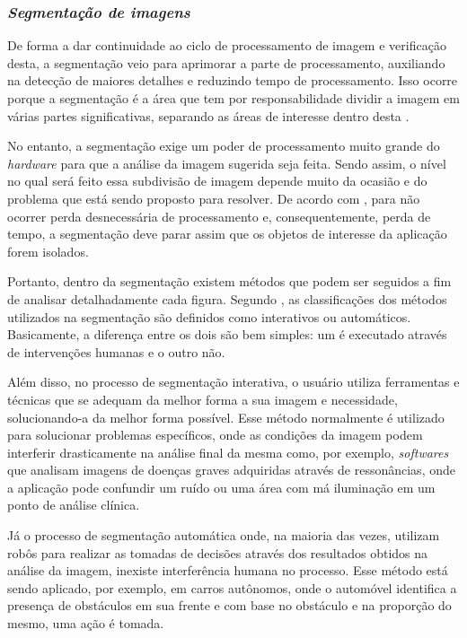 \subsubsection{\textit{Segmentação de imagens}}

De forma a dar continuidade ao ciclo de processamento de imagem e verificação desta, a segmentação veio para aprimorar a parte de processamento, auxiliando na detecção de maiores detalhes e reduzindo tempo de processamento. Isso ocorre porque a segmentação é a área que tem por responsabilidade dividir a imagem em várias partes significativas, separando as áreas de interesse dentro desta \cite{FILHO1999}.

No entanto, a segmentação exige um poder de processamento muito grande do \textit{hardware} para que a análise da imagem sugerida seja feita. Sendo assim, o nível no qual será feito essa subdivisão de imagem depende muito da ocasião e do problema que está sendo proposto para resolver. De acordo com , para não ocorrer perda desnecessária de processamento e, consequentemente, perda de tempo, a segmentação deve parar assim que os objetos de interesse da aplicação forem isolados.

Portanto, dentro da segmentação existem métodos que podem ser seguidos a fim de analisar detalhadamente cada figura. Segundo , as classificações dos métodos utilizados na segmentação são definidos como interativos ou automáticos. Basicamente, a diferença entre os dois são bem simples: um é executado através de intervenções humanas e o outro não.

Além disso, no processo de segmentação interativa, o usuário utiliza ferramentas e técnicas que se adequam da melhor forma a sua imagem e necessidade, solucionando-a da melhor forma possível. Esse método normalmente é utilizado para solucionar problemas específicos, onde as condições da imagem podem interferir drasticamente na análise final da mesma como, por exemplo, \textit{softwares} que analisam imagens de doenças graves adquiridas através de ressonâncias, onde a aplicação pode confundir um ruído ou uma área com má iluminação em um ponto de análise clínica.

Já o processo de segmentação automática onde, na maioria das vezes, utilizam robôs para realizar as tomadas de decisões através dos resultados obtidos na análise da imagem, inexiste interferência humana no processo. Esse método está sendo aplicado, por exemplo, em carros autônomos, onde o automóvel identifica a presença de obstáculos em sua frente e com base no obstáculo e na proporção do mesmo, uma ação é tomada.


